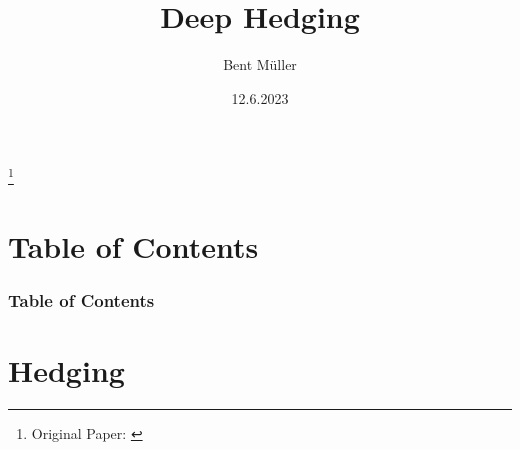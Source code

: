 \documentclass[serif]{beamer}
\title{Deep Hedging}
\author{Bent Müller}
\institute{University of Hamburg, Department of Mathematics}
\date{12.6.2023}
\begin{document}
\begin{frame}
    \titlepage
    \footnote{
        Original Paper: \cite[Deep Hedging]{buehler2018deep}
    }
\end{frame}


\section{Table of Contents}

\begin{frame}
    \frametitle{Table of Contents}
    \tableofcontents
\end{frame}

\section{Hedging}
\end{document}
